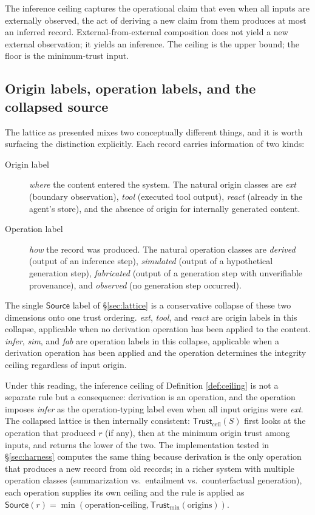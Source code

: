 \documentclass[11pt]{article}
\newcommand{\Source}{\mathsf{Source}}
\newcommand{\Trust}{\mathsf{Trust}}
\begin{document}
The inference ceiling captures the operational claim that even when all inputs are externally observed, the act of deriving a new claim from them produces at most an inferred record. External-from-external composition does not yield a new external observation; it yields an inference. The ceiling is the upper bound; the floor is the minimum-trust input.

\subsection{Origin labels, operation labels, and the collapsed source}
\label{sec:origin-operation}

The lattice as presented mixes two conceptually different things, and it is worth surfacing the distinction explicitly. Each record carries information of two kinds:
\begin{description}
\item[Origin label] \emph{where} the content entered the system. The natural origin classes are \emph{ext} (boundary observation), \emph{tool} (executed tool output), \emph{react} (already in the agent's store), and the absence of origin for internally generated content.
\item[Operation label] \emph{how} the record was produced. The natural operation classes are \emph{derived} (output of an inference step), \emph{simulated} (output of a hypothetical generation step), \emph{fabricated} (output of a generation step with unverifiable provenance), and \emph{observed} (no generation step occurred).
\end{description}

The single $\Source$ label of \S\ref{sec:lattice} is a conservative collapse of these two dimensions onto one trust ordering. \emph{ext}, \emph{tool}, and \emph{react} are origin labels in this collapse, applicable when no derivation operation has been applied to the content. \emph{infer}, \emph{sim}, and \emph{fab} are operation labels in this collapse, applicable when a derivation operation has been applied and the operation determines the integrity ceiling regardless of input origin.

Under this reading, the inference ceiling of Definition \ref{def:ceiling} is not a separate rule but a consequence: derivation is an operation, and the operation imposes \emph{infer} as the operation-typing label even when all input origins were \emph{ext}. The collapsed lattice is then internally consistent: $\Trust_{\text{ceil}}(S)$ first looks at the operation that produced $r$ (if any), then at the minimum origin trust among inputs, and returns the lower of the two. The implementation tested in \S\ref{sec:harness} computes the same thing because derivation is the only operation that produces a new record from old records; in a richer system with multiple operation classes (summarization vs.\ entailment vs.\ counterfactual generation), each operation supplies its own ceiling and the rule is applied as $\Source(r) = \min(\text{operation-ceiling}, \Trust_{\min}(\text{origins}))$.
\end{document}
